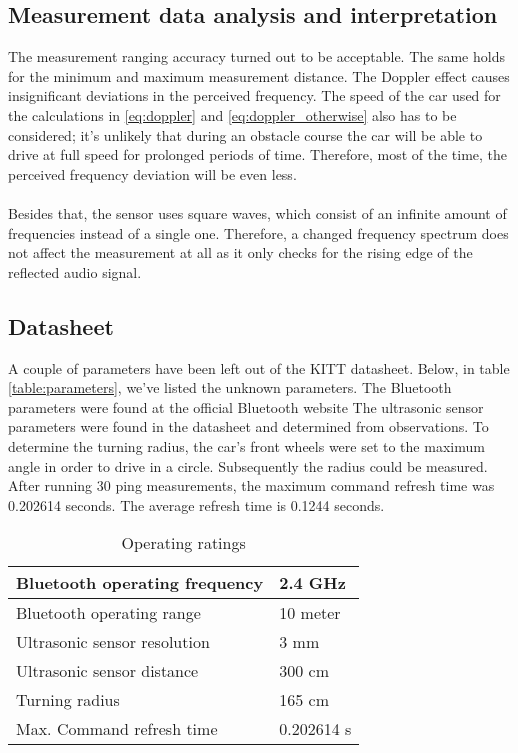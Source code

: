 \documentclass[final]{scrreprt} %
\begin{document}
\subsection{Measurement data analysis and interpretation}

The measurement ranging accuracy turned out to be acceptable. 
The same holds for the minimum and maximum measurement distance. 
The Doppler effect causes insignificant deviations in the perceived frequency. 
The speed of the car used for the calculations in \ref{eq:doppler} and \ref{eq:doppler_otherwise} also has to be considered; it's unlikely that during an obstacle course the car will be able to drive at full speed for prolonged periods of time.
Therefore, most of the time, the perceived frequency deviation will be even less.
\\ \\
Besides that, the sensor uses square waves, which consist of an infinite amount of frequencies instead of a single one.
Therefore, a changed frequency spectrum does not affect the measurement at all as it only checks for the rising edge of the reflected audio signal.

\subsection{Datasheet}

A couple of parameters have been left out of the KITT datasheet. Below, in table \ref{table:parameters}, we've listed the unknown parameters. 
The Bluetooth parameters were found at the official Bluetooth website %
The ultrasonic sensor parameters were found in the datasheet and determined from observations. 
To determine the turning radius, the car's front wheels were set to the maximum angle in order to drive in a circle. Subsequently the radius could be measured. 
After running 30 ping measurements, the maximum command refresh time was 0.202614 seconds. 
The average refresh time is 0.1244 seconds.

\begin{table}[H]
\begin{center}
\begin{tabular}{ | l | l |}
    \hline
    Bluetooth operating frequency & 2.4 GHz \\ \hline
    Bluetooth operating range & 10 meter \\\hline
    Ultrasonic sensor resolution    & 3 mm \\\hline
    Ultrasonic sensor distance	         & 300 cm \\\hline
    Turning radius & 165 cm \\\hline
    Max. Command refresh time & 0.202614 s\\\hline
\end{tabular}
\caption{Operating ratings}
\end{center}
\end{table}
\label{table:parameters}
\end{document}
